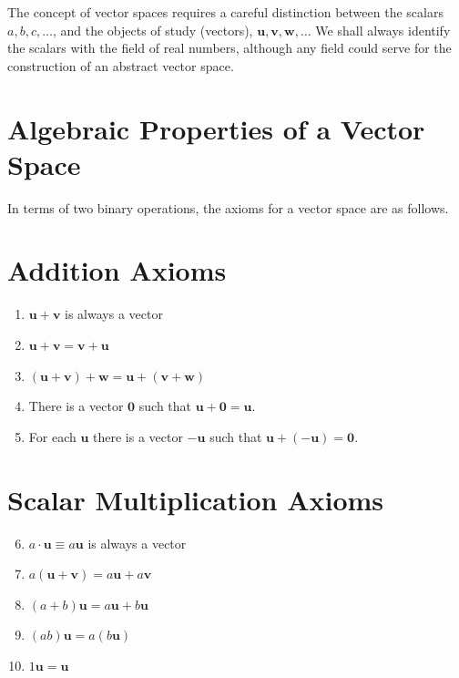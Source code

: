\documentclass[10pt]{article}
\begin{document}
The concept of vector spaces requires a careful distinction between the scalars $a, b, c, \ldots$, and the objects of study (vectors), $\mathbf{u}, \mathbf{v}, \mathbf{w}, \ldots$ We shall always identify the scalars with the field of real numbers, although any field could serve for the construction of an abstract vector space.

\section*{Algebraic Properties of a Vector Space}
In terms of two binary operations, the axioms for a vector space are as follows.

\section*{Addition Axioms}
\begin{enumerate}
  \item $\mathbf{u}+\mathbf{v}$ is always a vector

  \item $\mathbf{u}+\mathbf{v}=\mathbf{v}+\mathbf{u}$

  \item $(\mathbf{u}+\mathbf{v})+\mathbf{w}=\mathbf{u}+(\mathbf{v}+\mathbf{w})$

  \item There is a vector $\mathbf{0}$ such that $\mathbf{u}+\mathbf{0}=\mathbf{u}$.

  \item For each $\mathbf{u}$ there is a vector $-\mathbf{u}$ such that $\mathbf{u}+(-\mathbf{u})=\mathbf{0}$.

\end{enumerate}

\section*{Scalar Multiplication Axioms}
\begin{enumerate}
  \setcounter{enumi}{5}
  \item $a \cdot \mathbf{u} \equiv a \mathbf{u}$ is always a vector
  \item $a(\mathbf{u}+\mathbf{v})=a \mathbf{u}+a \mathbf{v}$
  \item $(a+b) \mathbf{u}=a \mathbf{u}+b \mathbf{u}$
  \item $(a b) \mathbf{u}=a(b \mathbf{u})$
  \item $1 \mathbf{u}=\mathbf{u}$
\end{enumerate}
\end{document}
